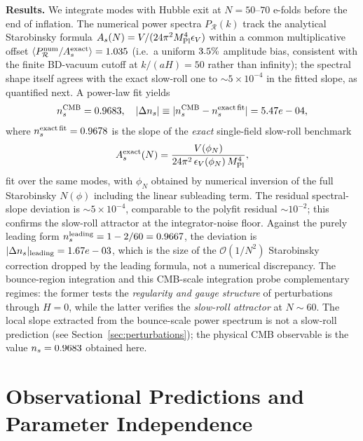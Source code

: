 \documentclass[11pt,a4paper]{article}
\begin{document}
\textbf{Results.} We integrate \nCMBmodes{} modes with Hubble exit at $N = 50$--$70$ e-folds before the end of inflation. The numerical power spectra $P_\mathcal{R}(k)$ track the analytical Starobinsky formula $A_s(N) = V/(24\pi^2 M_{\rm Pl}^4 \epsilon_V)$ within a common multiplicative offset $\langle P_\mathcal{R}^{\rm num}/A_s^{\rm exact}\rangle = 1.035$ (i.e.\ a uniform $3.5\%$ amplitude bias, consistent with the finite BD-vacuum cutoff at $k/(aH) = 50$ rather than infinity); the spectral shape itself agrees with the exact slow-roll one to $\sim 5 \times 10^{-4}$ in the fitted slope, as quantified next.  A power-law fit yields
\begin{equation}
n_s^{\rm CMB} = 0.9683, \quad |\Delta n_s| \equiv |n_s^{\rm CMB} - n_s^{\rm exact\,fit}| = 5.47e-04,
\end{equation}
where $n_s^{\rm exact\,fit} = 0.9678$ is the slope of the \emph{exact} single-field slow-roll benchmark
\begin{equation}
A_s^{\rm exact}(N) = \frac{V(\phi_N)}{24\pi^2\,\epsilon_V(\phi_N)\,M_{\rm Pl}^4},
\label{eq:As_exact_benchmark}
\end{equation}
fit over the same \nCMBmodes{} modes, with $\phi_N$ obtained by numerical inversion of the full Starobinsky $N(\phi)$ including the linear subleading term.  The residual spectral-slope deviation is $\sim 5 \times 10^{-4}$, comparable to the polyfit residual $\sim 10^{-2}$; this confirms the slow-roll attractor at the integrator-noise floor.  Against the purely leading form $n_s^{\rm leading} = 1 - 2/60 = 0.9667$, the deviation is $|\Delta n_s|_{\rm leading} = 1.67e-03$, which is the size of the $\mathcal{O}(1/N^2)$ Starobinsky correction dropped by the leading formula, not a numerical discrepancy.  The bounce-region integration and this CMB-scale integration probe complementary regimes: the former tests the \emph{regularity and gauge structure} of perturbations through $H=0$, while the latter verifies the \emph{slow-roll attractor} at $N \sim 60$.  The local slope extracted from the bounce-scale power spectrum is not a slow-roll prediction (see Section~\ref{sec:perturbations}); the physical CMB observable is the value $n_s = 0.9683$ obtained here.

\section{Observational Predictions and Parameter Independence}
\label{sec:observables}
\end{document}
